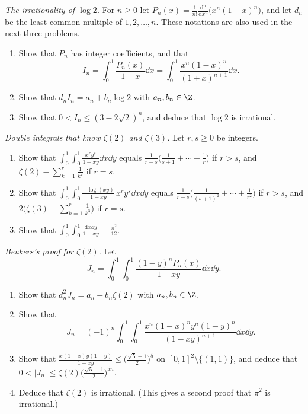 \begin{exercise}[$\star\star$]\label{pb:logtwo}
\emph{The irrationality of $\log2$.} For $n\ge0$ let $P_n(x)=\frac1{n!}\frac{\mathrm d^n}{\mathrm dx^n}\bigl(x^n(1-x)^n\bigr)$, and let $d_n$ be the least common multiple of $1,2,\dots,n$. These notations are also used in the next three problems.
\begin{enumerate}[label=(\alph*)]
\item Show that $P_n$ has integer coefficients, and that
\[
I_n=\int_0^1\frac{P_n(x)}{1+x}\dd x=\int_0^1\frac{x^n(1-x)^n}{(1+x)^{n+1}}\dd x.
\]
\item Show that $d_nI_n=a_n+b_n\log2$ with $a_n,b_n\in\Z$.
\item Show that $0<I_n\le(3-2\sqrt2)^n$, and deduce that $\log2$ is irrational.
\end{enumerate}
\end{exercise}

\begin{exercise}[$\star$]\label{pb:doubleint}
\emph{Double integrals that know $\zeta(2)$ and $\zeta(3)$.} Let $r,s\ge0$ be integers.
\begin{enumerate}[label=(\alph*)]
\item Show that $\displaystyle\int_0^1\!\!\int_0^1\frac{x^ry^s}{1-xy}\dd x\dd y$ equals $\frac1{r-s}\bigl(\frac1{s+1}+\cdots+\frac1r\bigr)$ if $r>s$, and
$\zeta(2)-\sum_{k=1}^r\frac1{k^2}$ if $r=s$.
\item Show that $\displaystyle\int_0^1\!\!\int_0^1\frac{-\log(xy)}{1-xy}\,x^ry^s\dd x\dd y$ equals $\frac1{r-s}\bigl(\frac1{(s+1)^2}+\cdots+\frac1{r^2}\bigr)$ if $r>s$, and
$2\bigl(\zeta(3)-\sum_{k=1}^r\frac1{k^3}\bigr)$ if $r=s$.
\item Show that $\displaystyle\int_0^1\!\!\int_0^1\frac{\mathrm dx\dd y}{1+xy}=\frac{\pi^2}{12}$.
\end{enumerate}
\end{exercise}

\begin{exercise}[$\star\star\star$]\label{pb:beukerstwo}
\emph{Beukers's proof for $\zeta(2)$.} Let
\[
J_n=\int_0^1\!\!\int_0^1\frac{(1-y)^nP_n(x)}{1-xy}\dd x\dd y.
\]
\begin{enumerate}[label=(\alph*)]
\item Show that $d_n^2J_n=a_n+b_n\zeta(2)$ with $a_n,b_n\in\Z$.
\item Show that
\[
J_n=(-1)^n\int_0^1\!\!\int_0^1\frac{x^n(1-x)^ny^n(1-y)^n}{(1-xy)^{n+1}}\dd x\dd y.
\]
\item Show that $\frac{x(1-x)y(1-y)}{1-xy}\le\bigl(\frac{\sqrt5-1}2\bigr)^5$ on $[0,1]^2\setminus\{(1,1)\}$, and deduce that $0<|J_n|\le\zeta(2)\bigl(\frac{\sqrt5-1}2\bigr)^{5n}$.
\item Deduce that $\zeta(2)$ is irrational. (This gives a second proof that $\pi^2$ is irrational.)
\end{enumerate}
\end{exercise}

